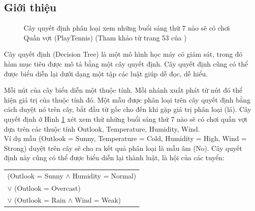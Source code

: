 \documentclass[12pt]{report}
\begin{document}
			\subsection*{Giới thiệu}
				\begin{figure}[H]					
					\centering
										
					\caption{Cây quyết định phân loại xem những buổi sáng thứ 7 nào sẽ có chơi Quần vợt (PlayTennis) (Tham khảo từ trang 53 của \cite{mltextbook})}
					\label{fig:tree}
				\end{figure}
				\par Cây quyết định (Decision Tree) là một mô hình học máy có giám sát, trong đó hàm mục tiêu được mô tả bằng một cây quyết định. Cây quyết định cũng có thể được biểu diễn lại dưới dạng một tập các luật giúp dễ đọc, dễ hiểu.
				\par Mỗi nút của cây biểu diễn một thuộc tính. Mỗi nhánh xuất phát từ nút đó thể hiện giá trị của thuộc tính đó. Một mẫu được phân loại trên cây quyết định bằng cách duyệt nó trên cây, bắt đầu từ gốc cho đến khi gặp giá trị phân loại (lá). 
				Cây quyết định ở Hình \ref{fig:tree} xét xem thử những buổi sáng thứ 7 nào sẽ có chơi quần vợt dựa trên các thuộc tính Outlook, Temperature, Humidity, Wind.
				\\Ví dụ mẫu (Outlook = Sunny, Temperature = Cold, Humidity = High, Wind = Strong) duyệt trên cây sẽ cho ra kết quả phân loại là mẫu âm (No). Cây quyết định này cũng có thể được biểu diễn lại thành luật, là hội của các tuyển:
				\begin{center}
					\begin{tabular}{l}				
						(Outlook = Sunny $\wedge$ Humidity = Normal)
						\\$\lor$ (Outlook = Overcast)
						\\$\lor$ (Outlook = Rain $\wedge$ Wind = Weak)
					\end{tabular}
				\end{center}											
\end{document}
